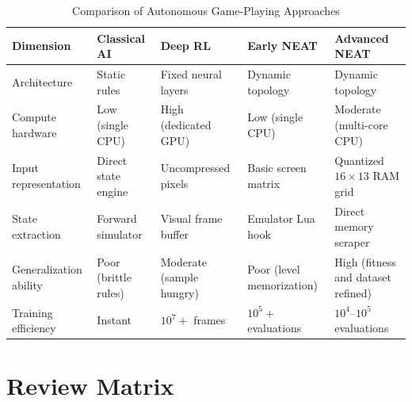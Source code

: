 \begin{table}[H]
\centering
\caption{Comparison of Autonomous Game-Playing Approaches}
\label{tab:paradigm-comparison}
\small
\begin{tabularx}{\textwidth}{@{}>{\raggedright\arraybackslash}p{}
                             >{\raggedright\arraybackslash}X
                             >{\raggedright\arraybackslash}X
                             >{\raggedright\arraybackslash}X
                             >{\raggedright\arraybackslash}X@{}}
\toprule
\textbf{Dimension} & \textbf{Classical AI} & \textbf{Deep RL} &
\textbf{Early NEAT} & \textbf{Advanced NEAT} \\
\midrule
Architecture & Static rules & Fixed neural layers & Dynamic topology &
Dynamic topology \\
\addlinespace
Compute hardware & Low (single CPU) & High (dedicated GPU) &
Low (single CPU) & Moderate (multi-core CPU) \\
\addlinespace
Input representation & Direct state engine & Uncompressed pixels &
Basic screen matrix & Quantized $16 \times 13$ RAM grid \\
\addlinespace
State extraction & Forward simulator & Visual frame buffer &
Emulator Lua hook & Direct memory scraper \\
\addlinespace
Generalization ability & Poor (brittle rules) & Moderate (sample hungry) &
Poor (level memorization) & High (fitness and dataset refined) \\
\addlinespace
Training efficiency & Instant & $10^7+$ frames & $10^5+$ evaluations &
$10^4$--$10^5$ evaluations \\
\bottomrule
\end{tabularx}
\end{table}

\FloatBarrier
\clearpage

\section{Review Matrix}
\label{sec:review-matrix}

